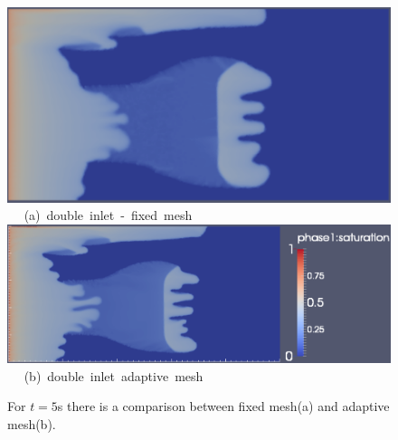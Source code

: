 \begin{landscape}
\begin{figure}[ht] 
\vbox{
\hbox{\hspace{3.5cm}
\includegraphics[width=.65\textwidth]{./Pics1/5reg_dinlet_fixed_500.pdf} 
}
\vspace{0.0cm}
\hbox{\hspace{6.5cm} (a) double inlet - fixed mesh   
}
\hbox{\hspace{3.5cm}
\includegraphics[width=.9\textwidth]{./Pics1/5reg_dinlet_adapt_500_1.pdf}
}
\vspace{0.0cm}
\hbox{\hspace{6.5cm} (b) double inlet adaptive mesh   
}
}     
\caption{For $t=5$s there is a comparison between fixed mesh(a) and adaptive mesh(b).}
\label{fig:3testcase_b}
\end{figure}
\end{landscape}
\clearpage

